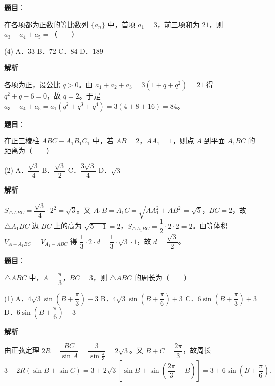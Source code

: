 \begin{answer}

\textbf{题目}：

在各项都为正数的等比数列 $\{a_n\}$ 中，首项 $a_1 = 3$，前三项和为 $21$，则 $a_3 + a_4 + a_5 =$\mbox{（　　）}

\begin{gkopts}(4)
\task A．$33$
\task B．$72$
\task C．$84$
\task D．$189$
\end{gkopts}

\textbf{解析}

各项为正，设公比 $q > 0$。由 $a_1 + a_2 + a_3 = 3(1 + q + q^2) = 21$ 得 $q^2 + q - 6 = 0$，故 $q = 2$。于是 $a_3 + a_4 + a_5 = a_1(q^2 + q^3 + q^4) = 3(4 + 8 + 16) = 84$。


\end{answer}
\begin{answer}

\textbf{题目}：

在正三棱柱 $ABC - A_1B_1C_1$ 中，若 $AB = 2$，$AA_1 = 1$，则点 $A$ 到平面 $A_1BC$ 的距离为\mbox{（　　）}

\begin{gkopts}(2)
\task A．$\dfrac{\sqrt{3}}{4}$
\task B．$\dfrac{\sqrt{3}}{2}$
\task C．$\dfrac{3\sqrt{3}}{4}$
\task D．$\sqrt{3}$
\end{gkopts}

\textbf{解析}

$S_{\triangle ABC} = \dfrac{\sqrt{3}}{4}\cdot 2^2 = \sqrt{3}$。又 $A_1B = A_1C = \sqrt{AA_1^2 + AB^2} = \sqrt{5}$，$BC = 2$，故 $\triangle A_1BC$ 边 $BC$ 上的高为 $\sqrt{5 - 1} = 2$，$S_{\triangle A_1BC} = \dfrac{1}{2}\cdot 2\cdot 2 = 2$。由等体积 $V_{A - A_1BC} = V_{A_1 - ABC}$ 得 $\dfrac{1}{3}\cdot 2\cdot d = \dfrac{1}{3}\cdot\sqrt{3}\cdot 1$，故 $d = \dfrac{\sqrt{3}}{2}$。


\end{answer}
\begin{answer}

\textbf{题目}：

$\triangle ABC$ 中，$A = \dfrac{\pi}{3}$，$BC = 3$，则 $\triangle ABC$ 的周长为\mbox{（　　）}

\begin{gkopts}(1)
\task A．$4\sqrt{3}\sin\left(B + \dfrac{\pi}{3}\right) + 3$
\task B．$4\sqrt{3}\sin\left(B + \dfrac{\pi}{6}\right) + 3$
\task C．$6\sin\left(B + \dfrac{\pi}{3}\right) + 3$
\task D．$6\sin\left(B + \dfrac{\pi}{6}\right) + 3$
\end{gkopts}

\textbf{解析}

由正弦定理 $2R = \dfrac{BC}{\sin A} = \dfrac{3}{\sin\frac{\pi}{3}} = 2\sqrt{3}$。又 $B + C = \dfrac{2\pi}{3}$，故周长
\nopagebreak[4]
\[
3 + 2R\left(\sin B + \sin C\right) = 3 + 2\sqrt{3}\left[\sin B + \sin\left(\frac{2\pi}{3} - B\right)\right] = 3 + 6\sin\left(B + \frac{\pi}{6}\right).
\]


\end{answer}

